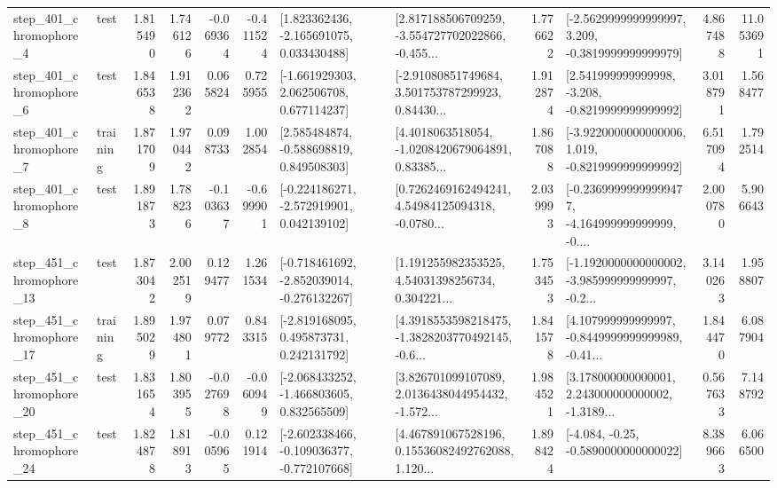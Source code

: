 \begin{tabular}{llrrrrllrlrr}
   step\_401\_chromophore\_4 &      test &      1.815490 &    1.746126 &     -0.069364 & -0.411524 &    [1.823362436, -2.165691075, 0.033430488] &  [2.817188506709259, -3.554727702022866, -0.455... &       1.776622 &  [-2.5629999999999997, 3.209, -0.3819999999999979] &            4.867488 &         11.053691 \\
   step\_401\_chromophore\_6 &      test &      1.846538 &    1.912362 &      0.065824 &  0.725955 &    [-1.661929303, 2.062506708, 0.677114237] &  [-2.91080851749684, 3.501753787299923, 0.84430... &       1.912874 &   [2.541999999999998, -3.208, -0.8219999999999992] &            3.018791 &          1.568477 \\
   step\_401\_chromophore\_7 &  training &      1.871709 &    1.970442 &      0.098733 &  1.002854 &    [2.585484874, -0.588698819, 0.849508303] &  [4.4018063518054, -1.0208420679064891, 0.83385... &       1.867088 &  [-3.9220000000000006, 1.019, -0.8219999999999992] &            6.517094 &          1.792514 \\
   step\_401\_chromophore\_8 &      test &      1.891873 &    1.788236 &     -0.103637 & -0.699901 &   [-0.224186271, -2.572919901, 0.042139102] &  [0.7262469162494241, 4.54984125094318, -0.0780... &       2.039993 &  [-0.23699999999999477, -4.164999999999999, -0.... &            2.000780 &          5.906643 \\
  step\_451\_chromophore\_13 &      test &      1.873042 &    2.002519 &      0.129477 &  1.261534 &  [-0.718461692, -2.852039014, -0.276132267] &  [1.191255982353525, 4.54031398256734, 0.304221... &       1.753453 &  [-1.1920000000000002, -3.985999999999997, -0.2... &            3.140263 &          1.958807 \\
  step\_451\_chromophore\_17 &  training &      1.895029 &    1.974801 &      0.079772 &  0.843315 &    [-2.819168095, 0.495873731, 0.242131792] &  [4.3918553598218475, -1.3828203770492145, -0.6... &       1.841578 &  [4.107999999999997, -0.8449999999999989, -0.41... &            1.844470 &          6.087904 \\
  step\_451\_chromophore\_20 &      test &      1.831654 &    1.803955 &     -0.027698 & -0.060949 &   [-2.068433252, -1.466803605, 0.832565509] &  [3.826701099107089, 2.0136438044954432, -1.572... &       1.984521 &  [3.178000000000001, 2.243000000000002, -1.3189... &            0.567633 &          7.148792 \\
  step\_451\_chromophore\_24 &      test &      1.824878 &    1.818913 &     -0.005965 &  0.121914 &  [-2.602338466, -0.109036377, -0.772107668] &  [4.467891067528196, 0.15536082492762088, 1.120... &       1.898424 &               [-4.084, -0.25, -0.5890000000000022] &            8.389663 &          6.066500 \\

\end{tabular}
